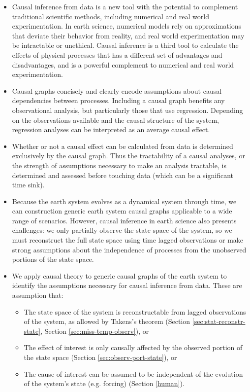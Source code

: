 \documentclass[12pt]{article}
\begin{document}
\begin{itemize}
\item Causal inference from data is a new tool with the potential to
  complement traditional scientific methods, including numerical and
  real world experimentation. In earth science, numerical models rely
  on approximations that deviate their behavior from reality, and real
  world experimentation may be intractable or unethical. Causal
  inference is a third tool to calculate the effects of physical
  processes that has a different set of advantages and
  disadvantages, and is a powerful complement to numerical and real
  world experimentation.
\item Causal graphs concisely and clearly encode assumptions about
  causal dependencies between processes. Including a causal graph
  benefits any observational analysis, but particularly those that use
  regression. Depending on the observations available and the causal
  structure of the system, regression analyses can be interpreted as
  an average causal effect.
\item Whether or not a causal effect can be calculated from data is
  determined exclusively by the causal graph. Thus the tractability of
  a causal analyses, or the strength of assumptions necessary to make
  an analysis tractable, is determined and assessed before touching
  data (which can be a significant time sink).
\item Because the earth system evolves as a dynamical system through
  time, we can construction generic earth system causal graphs
  applicable to a wide range of scenarios. However, causal inference
  in earth science also presents challenges: we only partially observe
  the state space of the system, so we must reconstruct the full state
  space using time lagged observations or make strong assumptions
  about the independence of processes from the unobserved portions of
  the state space.
\item We apply causal theory to generic causal graphs of the earth
  system to identify the assumptions necessary for causal inference
  from data. These are assumption that:
  \begin{itemize}
  \item The state space of the system is reconstructable
    from lagged observations of the system, as allowed by
    Takens's theorem (Section \ref{sec:stat-reconstr-state}, Section \ref{sec:miss-temp-observ}), or
  \item The effect of interest is only causally
    affected by the observed portion of the state space (Section
    \ref{sec:observ-port-state}), or
  \item The cause of interest can be assumed to be independent of the
    evolution of the system's state (e.g. forcing) (Section
    \ref{human}).
  \end{itemize}
\end{itemize}
\end{document}
